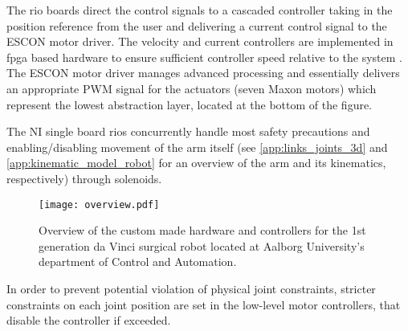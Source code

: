 The \gls{rio} boards direct the control signals to a cascaded controller taking in the position reference from the user and delivering a current control signal to the ESCON motor driver. The velocity and current controllers are implemented in \gls{fpga} based hardware to ensure sufficient controller speed relative to the system \citep{bib:robot_paper}. The ESCON motor driver manages advanced processing and essentially delivers an appropriate PWM signal for the actuators (seven Maxon motors) which represent the lowest abstraction layer, located at the bottom of the figure.

The NI single board \glspl{rio} concurrently handle most safety precautions and enabling/disabling movement of the arm itself (see \autoref{app:links_joints_3d} and \ref{app:kinematic_model_robot} for an overview of the arm and its kinematics, respectively) through solenoids.
\begin{figure}[H]
\hspace*{-5mm}
\texttt{[image: overview.pdf]}	
\caption{Overview of the custom made hardware and controllers for the 1st generation da Vinci surgical robot located at Aalborg University's department of Control and Automation.}
\label{fig:overview}
\end{figure}

In order to prevent potential violation of physical joint constraints, stricter constraints on each joint position are set in the low-level motor controllers, that disable the controller if exceeded.


